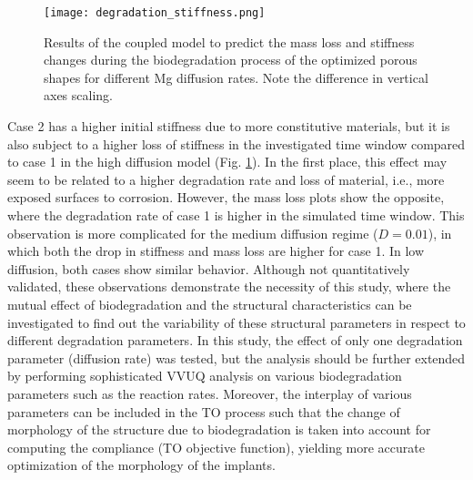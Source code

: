 \begin{figure}[h]
\centering
\medskip
\texttt{[image: degradation\_stiffness.png]}
\caption[Results of the coupled model to predict the stiffness changes during biodegradation]{Results of the coupled model to predict the mass loss and stiffness changes during the biodegradation process of the optimized porous shapes for different Mg diffusion rates. Note the difference in vertical axes scaling.} \label{fig:infill_degradation_stiffness}
\end{figure}


Case 2 has a higher initial stiffness due to more constitutive materials, but it is also subject to a higher loss of stiffness in the investigated time window compared to case 1 in the high diffusion model (Fig. \ref{fig:infill_degradation_stiffness}). In the first place, this effect may seem to be related to a higher degradation rate and loss of material, i.e., more exposed surfaces to corrosion. However, the mass loss plots show the opposite, where the degradation rate of case 1 is higher in the simulated time window. This observation is more complicated for the medium diffusion regime ($D=0.01$), in which both the drop in stiffness and mass loss are higher for case 1. In low diffusion, both cases show similar behavior. Although not quantitatively validated, these observations demonstrate the necessity of this study, where the mutual effect of biodegradation and the structural characteristics can be investigated to find out the variability of these structural parameters in respect to different degradation parameters. In this study, the effect of only one degradation parameter (diffusion rate) was tested, but the analysis should be further extended by performing sophisticated \gls{VVUQ} analysis on various biodegradation parameters such as the reaction rates. Moreover, the interplay of various parameters can be included in the \gls{TO} process such that the change of morphology of the structure due to biodegradation is taken into account for computing the compliance (TO objective function), yielding more accurate optimization of the morphology of the implants.


